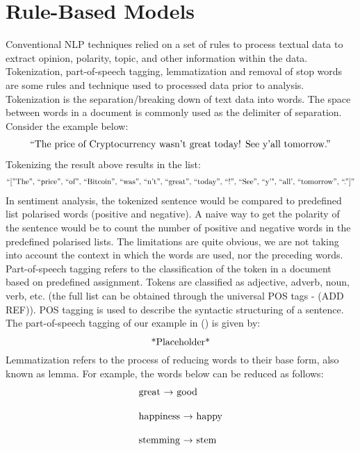 \par 

\section{Rule-Based Models}
Conventional NLP techniques relied on a set of rules to process textual data to extract opinion, polarity, topic, and other information within the data. Tokenization, part-of-speech tagging, lemmatization and removal of stop words are some rules and technique used to processed data prior to analysis. Tokenization is the separation/breaking down of text data into words. The space between words in a document is commonly used as the delimiter of separation. Consider the example below:
\begin{align*}
\intertext{“The price of Cryptocurrency wasn’t great today! See y’all tomorrow.”}    
\end{align*}
Tokenizing the result above results in the list:
\begin{align*}
    \intertext{“[”The”, “price”, “of”, “Bitcoin”, “was”,  “n’t”, “great”, “today”, “!”, “See”,  “y’", “all', “tomorrow”, “.”]”}    
\end{align*}
In sentiment analysis, the tokenized sentence would be compared to predefined list polarised words (positive and negative). A naive way to get the polarity of the sentence would be to count the number of positive and negative words in the predefined polarised lists. The limitations are quite obvious, we are not taking into account the context in which the words are used, nor the preceding words. Part-of-speech tagging refers to the classification of the token in a document based on predefined assignment. Tokens are classified as adjective,  adverb, noun, verb, etc. (the full list can be obtained through the universal POS tags - (ADD REF)). POS tagging is used to describe the syntactic structuring of a sentence. The part-of-speech tagging of our example in () is given by:
\begin{align*}
\intertext{*Placeholder*}   
\end{align*}
Lemmatization refers to the process of reducing words  to their base form, also known as lemma. For example, the words below can be reduced as follows:
\begin{align*}
\begin{matrix*}
    \intertext{great → good} \\
    \intertext{happiness → happy} \\
    \intertext{stemming → stem}
\end{matrix*}
\end{align*}

